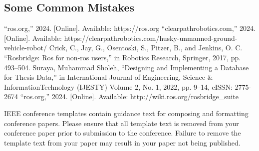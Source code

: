 \documentclass[conference]{IEEEtran}
\begin{document}
\subsection{Some Common Mistakes}

\begin{thebibliography}{00}
 “ros.org,”
2024.
[Online].
Available:
https://ros.org
 “clearpathrobotics.com,”
2024.
[Online].
Available:
https://clearpathrobotics.com/husky-unmanned-ground-vehicle-robot/
 Crick, C., Jay, G., Osentoski, S., Pitzer, B., and Jenkins, O. C. ``Rosbridge: Ros
for non-ros users,'' in Robotics Research, Springer, 2017, pp. 493--504.
 Suraya, Muhammad Sholeh, ``Designing and Implementing a Database for Thesis Data,'' in International Journal of Engineering, Science \& InformationTechnology (IJESTY)
Volume 2, No. 1, 2022, pp. 9--14, eISSN: 2775-2674
“ros.org,” 
2024.
[Online]. 
Available:
http://wiki.ros.org/rosbridge\_suite
\end{thebibliography}
\vspace{12pt}
\color{red}
IEEE conference templates contain guidance text for composing and formatting conference papers. Please ensure that all template text is removed from your conference paper prior to submission to the conference. Failure to remove the template text from your paper may result in your paper not being published.
\end{document}
